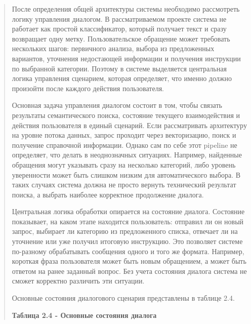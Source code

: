 \documentclass[
]{article}
\begin{document}
\begin{quote}
После определения общей архитектуры системы необходимо рассмотреть
логику управления диалогом. В рассматриваемом проекте система не
работает как простой классификатор, который получает текст и сразу
возвращает одну метку. Пользовательское обращение может требовать
нескольких шагов: первичного анализа, выбора из предложенных вариантов,
уточнения недостающей информации и получения инструкции по выбранной
категории. Поэтому в системе выделяется центральная логика управления
сценарием, которая определяет, что именно должно произойти после каждого
действия пользователя.

Основная задача управления диалогом состоит в том, чтобы связать
результаты семантического поиска, состояние текущего взаимодействия и
действия пользователя в единый сценарий. Если рассматривать архитектуру
на уровне потока данных, запрос проходит через векторизацию, поиск и
получение справочной информации. Однако сам по себе этот pipeline не
определяет, что делать в неоднозначных ситуациях. Например, найденные
обращения могут указывать сразу на несколько категорий, либо уровень
уверенности может быть слишком низким для автоматического выбора. В
таких случаях система должна не просто вернуть технический результат
поиска, а выбрать наиболее корректное продолжение диалога.

Центральная логика обработки опирается на состояние диалога. Состояние
показывает, на каком этапе находится пользователь: отправил ли он новый
запрос, выбирает ли категорию из предложенного списка, отвечает ли на
уточнение или уже получил итоговую инструкцию. Это позволяет системе
по-разному обрабатывать сообщения одного и того же формата. Например,
короткая фраза пользователя может быть новым обращением, а может быть
ответом на ранее заданный вопрос. Без учета состояния диалога система не
сможет корректно различить эти ситуации.

Основные состояния диалогового сценария представлены в таблице 2.4.

\textbf{Таблица 2.4 - Основные состояния диалога}
\end{quote}
\end{document}

